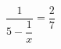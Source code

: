 \begin{ex}[type=equation]
	\begin{condition}
		$\dfrac{1}{5 - \dfrac{1}{x}} = \dfrac{2}{7}$
	\end{condition}
\end{ex}